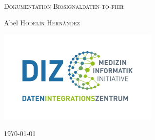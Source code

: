 \begin{titlepage}
	\thispagestyle{firstpage}
	
	\centering
	{\scshape\LARGE Dokumentation Biosignaldaten-to-\acs{fhir} \par} 
	\vspace{1.5cm}
		\vspace{2cm}
	{\Large Abel \textsc{Hodelín Hernández}\par} 
	\vspace{2cm}
	\includegraphics[width=8cm]{figures/diz}
	\vfill
	{\large \today\par}
	
\end{titlepage}